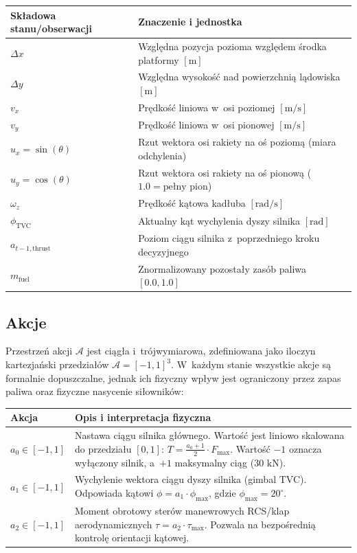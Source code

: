 \documentclass[12pt]{article}
\begin{document}
\begin{center}
\begin{tabular}{p{}p{}}
\toprule
Składowa stanu/obserwacji & Znaczenie i jednostka \\
\midrule
$\Delta x$ & Względna pozycja pozioma względem środka platformy $[\text{m}]$ \\
$\Delta y$ & Względna wysokość nad powierzchnią lądowiska $[\text{m}]$ \\
$v_x$ & Prędkość liniowa w~osi poziomej $[\text{m/s}]$ \\
$v_y$ & Prędkość liniowa w~osi pionowej $[\text{m/s}]$ \\
$u_x = \sin(\theta)$ & Rzut wektora osi rakiety na oś poziomą (miara odchylenia) \\
$u_y = \cos(\theta)$ & Rzut wektora osi rakiety na oś pionową ($1.0 = \text{pełny pion}$) \\
$\omega_z$ & Prędkość kątowa kadłuba $[\text{rad/s}]$ \\
$\phi_{\text{TVC}}$ & Aktualny kąt wychylenia dyszy silnika $[\text{rad}]$ \\
$a_{t-1, \text{thrust}}$ & Poziom ciągu silnika z~poprzedniego kroku decyzyjnego \\
$m_{\text{fuel}}$ & Znormalizowany pozostały zasób paliwa $[0.0, 1.0]$ \\
\bottomrule
\end{tabular}
\end{center}
\subsection{Akcje}

Przestrzeń akcji $\mathcal{A}$ jest ciągła i~trójwymiarowa, zdefiniowana jako iloczyn kartezjański przedziałów $\mathcal{A} = [-1, 1]^3$. W~każdym stanie wszystkie akcje są formalnie dopuszczalne, jednak ich fizyczny wpływ jest ograniczony przez zapas paliwa oraz fizyczne nasycenie siłowników:

\begin{center}
\begin{tabular}{p{}p{}}
\toprule
Akcja & Opis i interpretacja fizyczna \\
\midrule
$a_0 \in [-1, 1]$ & Nastawa ciągu silnika głównego. Wartość jest liniowo skalowana do przedziału $[0, 1]$: $T = \frac{a_0 + 1}{2} \cdot F_{\max}$. Wartość $-1$ oznacza wyłączony silnik, a~$+1$ maksymalny ciąg ($30\text{ kN}$). \\
$a_1 \in [-1, 1]$ & Wychylenie wektora ciągu dyszy silnika (gimbal TVC). Odpowiada kątowi $\phi = a_1 \cdot \phi_{\max}$, gdzie $\phi_{\max} = 20^\circ$. \\
$a_2 \in [-1, 1]$ & Moment obrotowy sterów manewrowych RCS/klap aerodynamicznych $\tau = a_2 \cdot \tau_{\max}$. Pozwala na bezpośrednią kontrolę orientacji kątowej. \\
\bottomrule
\end{tabular}
\end{center}
\end{document}

